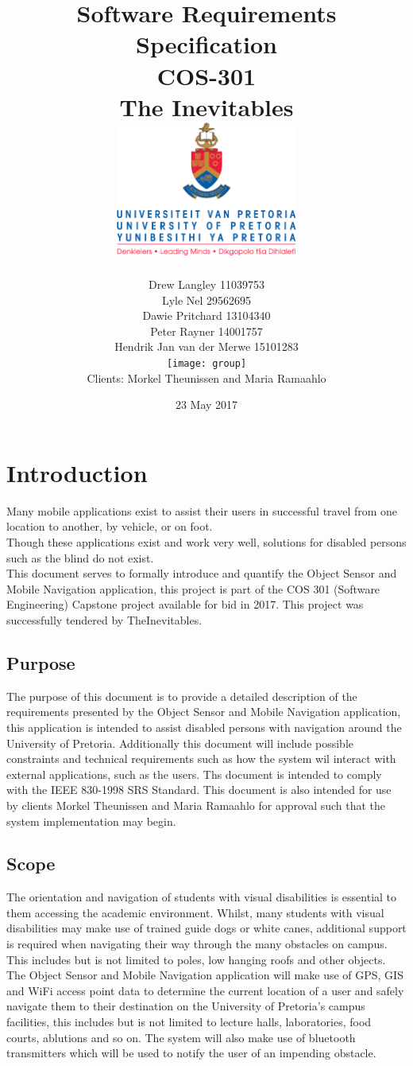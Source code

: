 \documentclass{article}
\title{ Software Requirements Specification \\ COS-301 \\ The Inevitables \\[0.5cm] \includegraphics[width=6cm]{front-page}}
\author{Drew Langley \hfill 11039753 \\ Lyle Nel \hfill 29562695 \\ Dawie Pritchard \hfill 13104340 \\  Peter Rayner \hfill 14001757\\ Hendrik Jan van der Merwe \hfill 15101283 \\ [1cm]\texttt{[image: group]}\\ [1cm] Clients: Morkel Theunissen and Maria Ramaahlo }
\date{23 May 2017}
\begin{document}
\maketitle
\pagebreak
\tableofcontents
\pagebreak


\section{Introduction}
		Many mobile applications exist to assist their users in successful travel from one location to another, by vehicle, or on foot. \\
		Though these applications exist and work very well, solutions for disabled persons such as the blind do not exist.\\
		This document serves to formally introduce and quantify the Object Sensor and Mobile Navigation application, this project is part of the COS 301 (Software Engineering) Capstone project available for bid in 2017. This project was successfully tendered by TheInevitables.
	
	\subsection{Purpose}
		The purpose of this document is to provide a detailed description of the requirements presented by the Object Sensor and Mobile Navigation application, this application is intended to assist disabled persons with navigation around the University of Pretoria. Additionally this document will include possible constraints and technical requirements such as how the system wil interact with external applications, such as the users. Ths document is intended to comply with the IEEE 830-1998 SRS Standard. This document is also intended for use by clients Morkel Theunissen and Maria Ramaahlo for approval such that the system implementation may begin.
		
	\subsection{Scope}
		The orientation and navigation of students with visual disabilities is essential to them accessing the academic environment. Whilst, many students with visual disabilities may make use of trained guide dogs or white canes, additional support is required when navigating their way through the many obstacles on campus. This includes but is not limited to poles, low hanging roofs and other objects.\\
		The Object Sensor and Mobile Navigation application will make use of GPS, GIS and WiFi access point data to determine the current location of a user and safely navigate them to their destination on the University of Pretoria's campus facilities, this includes but is not limited to lecture halls, laboratories, food courts, ablutions and so on. The system will also make use of bluetooth transmitters which will be used to notify the user of an impending obstacle.
		
\end{document}
